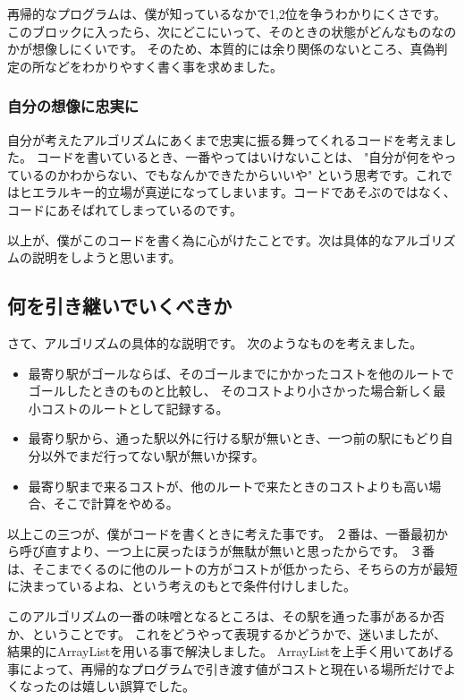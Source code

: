 \documentclass[titlepage]{jarticle}
\begin{document}
再帰的なプログラムは、僕が知っているなかで1,2位を争うわかりにくさです。
このブロックに入ったら、次にどこにいって、そのときの状態がどんなものなのかが想像しにくいです。
そのため、本質的には余り関係のないところ、真偽判定の所などをわかりやすく書く事を求めました。

\subsubsection{自分の想像に忠実に}

自分が考えたアルゴリズムにあくまで忠実に振る舞ってくれるコードを考えました。
コードを書いているとき、一番やってはいけないことは、
"自分が何をやっているのかわからない、でもなんかできたからいいや"
という思考です。これではヒエラルキー的立場が真逆になってしまいます。コードであそぶのではなく、コードにあそばれてしまっているのです。

以上が、僕がこのコードを書く為に心がけたことです。次は具体的なアルゴリズムの説明をしようと思います。

\subsection{何を引き継いでいくべきか}
さて、アルゴリズムの具体的な説明です。
次のようなものを考えました。

\begin{itemize}
\item 最寄り駅がゴールならば、そのゴールまでにかかったコストを他のルートでゴールしたときのものと比較し、
そのコストより小さかった場合新しく最小コストのルートとして記録する。

\item 最寄り駅から、通った駅以外に行ける駅が無いとき、一つ前の駅にもどり自分以外でまだ行ってない駅が無いか探す。

\item 最寄り駅まで来るコストが、他のルートで来たときのコストよりも高い場合、そこで計算をやめる。
\end{itemize}

以上この三つが、僕がコードを書くときに考えた事です。
２番は、一番最初から呼び直すより、一つ上に戻ったほうが無駄が無いと思ったからです。
３番は、そこまでくるのに他のルートの方がコストが低かったら、そちらの方が最短に決まっているよね、という考えのもとで条件付けしました。

このアルゴリズムの一番の味噌となるところは、その駅を通った事があるか否か、ということです。
これをどうやって表現するかどうかで、迷いましたが、結果的にArrayListを用いる事で解決しました。
ArrayListを上手く用いてあげる事によって、再帰的なプログラムで引き渡す値がコストと現在いる場所だけでよくなったのは嬉しい誤算でした。
\end{document}
